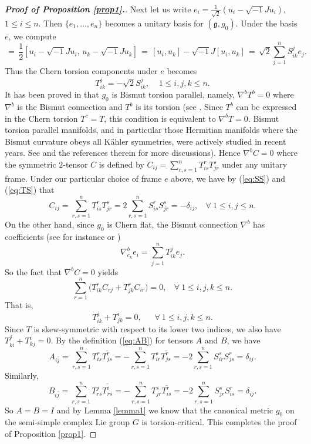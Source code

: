 \documentclass[10pt,a4paper]{amsart}
\theoremstyle{plain}
\theoremstyle{remark}
\begin{document}
\begin{proof}[{\bf Proof of Proposition \ref{prop1}.}]
Next let us write $e_i=\frac{1}{\sqrt{2}}(u_i - \sqrt{-1}Ju_i)$, $1\leq i\leq n$. Then $\{ e_1, \ldots , e_n\}$ becomes a unitary basis for $({\mathfrak g}, g_0)$. Under the basis $e$, we compute
\begin{equation*}
[e_i,e_k] \,= \,\frac{1}{2}[ u_i - \sqrt{-1}Ju_i, \,u_k - \sqrt{-1}Ju_k] \, = \, [u_i,u_k] - \sqrt{-1}J [u_i,u_k] \, = \, \sqrt{2}\sum_{j=1}^n S^j_{ik}e_j.
\end{equation*}
Thus the Chern torsion components under $e$ becomes 
\begin{equation} \label{eq:TS}
T^j_{ik} = - \sqrt{2}S^j_{ik}, \ \ \ \ \ 1 \leq i,j,k\leq n. 
\end{equation}
It has been proved in \cite[Theorem 1.2]{PodestaZ} that $g_0$ is Bismut torsion parallel, namely, $\nabla^bT^b=0$ where $\nabla^b$ is the Bismut connection and $T^b$ is its torsion (see \cite{Bismut}. Since $T^b$ can be expressed in the Chern torsion $T^c=T$, this condition is equivalent to $\nabla^bT=0$. Bismut torsion parallel manifolds, and in particular those Hermitian manifolds where the Bismut curvature obeys all K\"ahler symmetries, were actively studied in recent years. See \cite{YZZ, ZZ, Zheng} and the references therein for more discussions). Hence $\nabla^bC=0$ where the symmetric $2$-tensor $C$ is defined by $C_{ij}=\sum_{r,s=1}^n T^r_{is}T^s_{jr}$ under any unitary frame. Under our particular choice of frame $e$ above, we have by (\ref{eq:SS}) and (\ref{eq:TS}) that
$$ C_{ij} = \sum_{r,s=1}^n T^r_{is}T^s_{jr} = 2 \sum_{r,s=1}^n S^r_{is}S^s_{jr} = -\delta_{ij}, \ \ \ \ \forall \ 1\leq i,j\leq n. $$
On the other hand, since $g_0$ is Chern flat, the Bismut connection $\nabla^b$ has coefficients (see for instance \cite{YZ} or \cite{VYZ})
$$ \nabla^b_{e_k}e_i = \sum_{j=1}^n T^j_{ik}e_j. $$
So the fact that $\nabla^bC=0$ yields
$$ \sum_{r=1}^n \big( T^r_{ik}C_{rj} + T^r_{jk}C_{ir}\big) = 0, \ \ \ \ \forall  \ 1\leq i,j,k\leq n. $$
That is, 
\begin{equation}
 T^j_{ik}  + T^i_{jk} =0 , \ \ \ \ \ \ \ \forall \ 1\leq i,j,k\leq n.
\end{equation}
Since $T$ is skew-symmetric with respect to its lower two indices, we also have $T^j_{ki}+T^i_{kj}=0$. By the definition (\ref{eq:AB}) for tensors $A$ and $B$, we have
$$ A_{i\bar{j}} =\sum_{r,s=1}^n T^r_{is} \overline{T^r_{js}} = - \sum_{r,s=1}^n T^s_{ir} \overline{T^r_{js}} = -2 \sum_{r,s=1}^n S^s_{ir} S^r_{js} =\delta_{ij}. $$
Similarly,
$$ B_{i\bar{j}} =\sum_{r,s=1}^n T^j_{rs} \overline{T^i_{rs}} = - \sum_{r,s=1}^n T^s_{jr} \overline{T^r_{is}} = -2 \sum_{r,s=1}^n S^s_{jr} S^r_{is} =\delta_{ij}. $$
So $A=B=I$ and by Lemma \ref{lemma1} we know that the canonical metric  $g_0$ on the semi-simple complex Lie group $G$ is torsion-critical. This completes the proof of Proposition \ref{prop1}. 
\end{proof}
\end{document}
